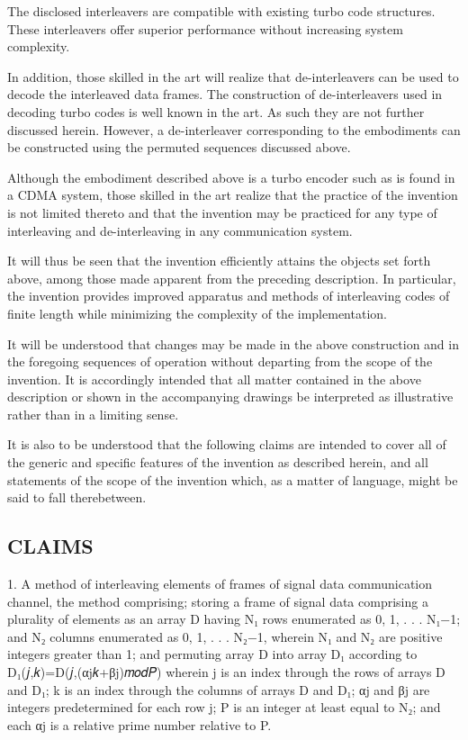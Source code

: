 \documentclass[11pt,a4paper]{article}
\begin{document}
The disclosed interleavers are compatible with existing turbo code structures. These interleavers offer superior performance without increasing system complexity.

In addition, those skilled in the art will realize that de-interleavers can be used to decode the interleaved data frames. The construction of de-interleavers used in decoding turbo codes is well known in the art. As such they are not further discussed herein. However, a de-interleaver corresponding to the embodiments can be constructed using the permuted sequences discussed above.

Although the embodiment described above is a turbo encoder such as is found in a CDMA system, those skilled in the art realize that the practice of the invention is not limited thereto and that the invention may be practiced for any type of interleaving and de-interleaving in any communication system.

It will thus be seen that the invention efficiently attains the objects set forth above, among those made apparent from the preceding description. In particular, the invention provides improved apparatus and methods of interleaving codes of finite length while minimizing the complexity of the implementation.

It will be understood that changes may be made in the above construction and in the foregoing sequences of operation without departing from the scope of the invention. It is accordingly intended that all matter contained in the above description or shown in the accompanying drawings be interpreted as illustrative rather than in a limiting sense.

It is also to be understood that the following claims are intended to cover all of the generic and specific features of the invention as described herein, and all statements of the scope of the invention which, as a matter of language, might be said to fall therebetween.

\subsection{CLAIMS}

1. A method of interleaving elements of frames of signal data communication channel, the method comprising; storing a frame of signal data comprising a plurality of elements as an array D having N₁ rows enumerated as 0, 1, . . . N₁−1; and N₂ columns enumerated as 0, 1, . . . N₂−1, wherein N₁ and N₂ are positive integers greater than 1; and permuting array D into array D₁ according to D₁(𝑗,𝑘)=D(𝑗,(αj𝑘+βj)𝑚𝑜𝑑𝑃)  wherein j is an index through the rows of arrays D and D₁; k is an index through the columns of arrays D and D₁; αj and βj are integers predetermined for each row j; P is an integer at least equal to N₂; and each αj is a relative prime number relative to P.
\end{document}

